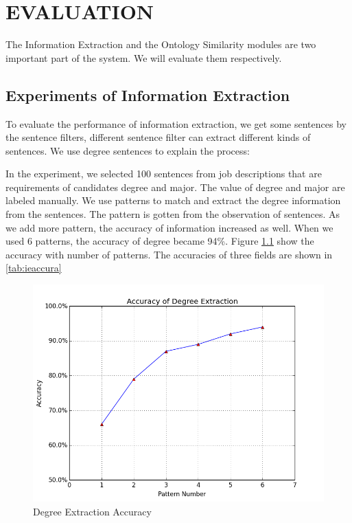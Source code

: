 \chapter{EVALUATION}

The Information Extraction and the Ontology Similarity modules are two important part of the system.  We will evaluate them respectively. 

\section{Experiments of Information Extraction }

To evaluate the performance of information extraction, we get some sentences by the sentence filters, different sentence filter can extract different kinds of sentences. We use degree sentences to explain the process: 
 
In the experiment, we selected 100 sentences from job descriptions that are requirements of candidates degree and major. The value of degree and major are labeled manually. We use patterns to  match and extract the degree information from the sentences. The pattern is gotten from the observation of sentences. As we add more pattern, the accuracy of information increased as well. When we used 6 patterns, the accuracy of degree became 94\%. Figure \ref{fig:degree_accuracy} show the accuracy with number of patterns. The accuracies of three fields are shown in \ref{tab:ieaccura}

\begin{figure}[htbp]
  \centering
  \includegraphics[scale=0.5]{images/degree_accuracy.png}
  \caption{Degree Extraction  Accuracy}
  \label{fig:degree_accuracy}
\end{figure}


